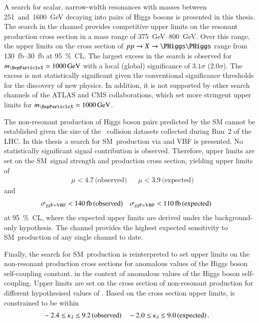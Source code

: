 A search for scalar, narrow-width resonances with masses between
\num{251}~and~\SI{1600}{\GeV} decaying into pairs of Higgs bosons is presented
in this thesis. The search in the \bbtautau channel provides competitive upper
limits on the resonant \HH production cross section in a mass range of
\SIrange{375}{800}{\GeV}. Over this range, the upper limits on the cross section
of $pp \to X \to \HH$ range from \SIrange{130}{30}{\femto\barn} at
\SI{95}{\percent}~CL. The largest excess in the search is observed for
$\mX = \SI{1000}{\GeV}$ with a local (global) significance of $3.1\sigma$
($2.0\sigma$). The excess is not statistically significant given the
conventional significance thresholds for the discovery of new physics. In
addition, it is not supported by other search channels of the ATLAS and CMS
collaborations, which set more stringent upper limits for
$\mX = \SI{1000}{\GeV}$.


The non-resonant production of Higgs boson pairs predicted by the SM cannot be
established given the size of the \pp~collision datasets collected during Run~2
of the LHC. In this thesis a search for SM~\HH production via \ggF and VBF is
presented. No statistically significant signal contribution is
observed. Therefore, upper limits are set on the SM~\HH signal strength and
production cross section, yielding upper limits of
\begin{align*}
  &\mu  < 4.7 \, \text{(observed)} && \mu < 3.9\,\text{(expected)}
\end{align*}
and
\begin{align*}
  &\xsecggfvbf < \SI{140}{\femto\barn} \,\text{(observed)} && \xsecggfvbf < \SI{110}{\femto\barn} \,\text{(expected)}
\end{align*}
at \SI{95}{\percent}~CL, where the expected upper limits are derived under the
background-only hypothesis. The \bbtautau channel provides the highest expected
sensitivity to SM~\HH production of any single channel to date.




Finally, the search for SM~\HH production is reinterpreted to set upper limits
on the non-resonant \HH production cross sections for anomalous values of the
Higgs boson self-coupling constant.
in the context of
anomalous values of the Higgs boson self-coupling. Upper limits are set on the
cross section of non-resonant \HH production for different hypothesised values
of \klambda. Based on the cross section upper limits, \klambda is constrained to
be within
\begin{align*}
  &-2.4 \leq \kappa_{\lambda} \leq 9.2 \,\text{(observed)} && -2.0 \leq \kappa_{\lambda} \leq 9.0 \,\text{(expected)} \,\text{.}
\end{align*}

